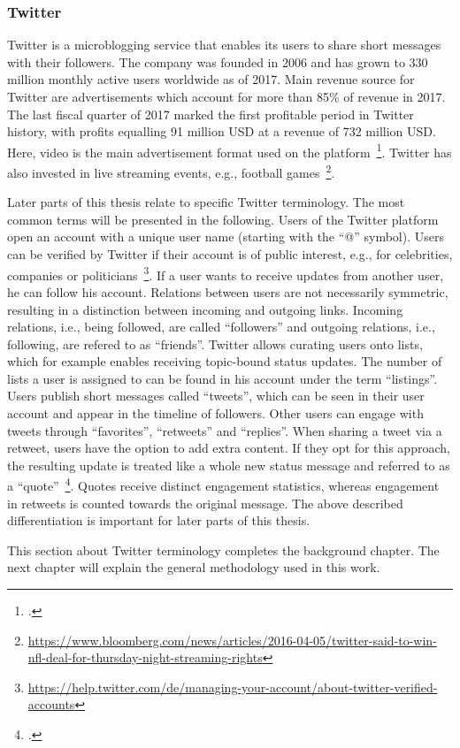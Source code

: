 \subsubsection{Twitter}
\label{sub:sn_twitter}

Twitter is a microblogging service that enables its users to share short
messages with their followers.
The company was founded in 2006 and has grown to 330 million monthly active
users worldwide as of 2017.
Main revenue source for Twitter are advertisements which account for more than
85\% of revenue in 2017.
The last fiscal quarter of 2017 marked the first profitable period in Twitter
history, with profits equalling 91 million USD at a revenue of 732 million USD.
Here, video is the main advertisement format used on the platform~\footcite{Twitter2018}.
Twitter has also invested in live streaming events, e.g., football games~\footnote{\url{https://www.bloomberg.com/news/articles/2016-04-05/twitter-said-to-win-nfl-deal-for-thursday-night-streaming-rights}}.

Later parts of this thesis relate to specific Twitter terminology.
The most common terms will be presented in the following.
Users of the Twitter platform open an account with a unique user name (starting
with the ``@'' symbol).
Users can be verified by Twitter if their account is of public interest, e.g.,
for celebrities, companies or politicians~\footnote{\url{https://help.twitter.com/de/managing-your-account/about-twitter-verified-accounts}}.
If a user wants to receive updates from another user, he can follow his
account.
Relations between users are not necessarily symmetric, resulting in a distinction
between incoming and outgoing links.
Incoming relations,
i.e., being followed, are called ``followers'' and outgoing relations, i.e.,
following, are refered to as ``friends''.
Twitter allows curating users onto lists, which for example enables receiving topic-bound
status updates.
The number of lists a user is assigned to can be found in his account under the
term ``listings''.
Users publish short messages called ``tweets'', which can be seen in their user
account and appear in the timeline of followers.
Other users can engage with tweets through ``favorites'', ``retweets'' and ``replies''.
When sharing a tweet via a retweet, users have the option to add extra content.
If they opt for this approach, the resulting update is treated like a whole new
status message and referred to as a ``quote''~\footcite{Kwak2010}.
Quotes receive distinct engagement statistics, whereas engagement in retweets
is counted towards the original message.
The above described differentiation is important for later parts of this thesis.

This section about Twitter terminology completes the background chapter.
The next chapter will explain the general methodology used in this work.
